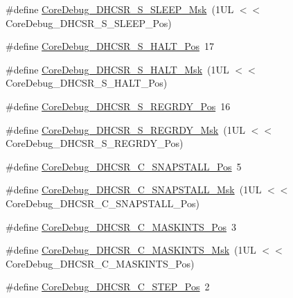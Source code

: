 \begin{DoxyCompactItemize}
\#define \hyperlink{group___c_m_s_i_s___core_debug_ga98d51538e645c2c1a422279cd85a0a25}{Core\+Debug\+\_\+\+D\+H\+C\+S\+R\+\_\+\+S\+\_\+\+S\+L\+E\+E\+P\+\_\+\+Msk}~(1\+U\+L $<$$<$ Core\+Debug\+\_\+\+D\+H\+C\+S\+R\+\_\+\+S\+\_\+\+S\+L\+E\+E\+P\+\_\+\+Pos)
\item 
\#define \hyperlink{group___c_m_s_i_s___core_debug_ga760a9a0d7f39951dc3f07d01f1f64772}{Core\+Debug\+\_\+\+D\+H\+C\+S\+R\+\_\+\+S\+\_\+\+H\+A\+L\+T\+\_\+\+Pos}~17
\item 
\#define \hyperlink{group___c_m_s_i_s___core_debug_ga9f881ade3151a73bc5b02b73fe6473ca}{Core\+Debug\+\_\+\+D\+H\+C\+S\+R\+\_\+\+S\+\_\+\+H\+A\+L\+T\+\_\+\+Msk}~(1\+U\+L $<$$<$ Core\+Debug\+\_\+\+D\+H\+C\+S\+R\+\_\+\+S\+\_\+\+H\+A\+L\+T\+\_\+\+Pos)
\item 
\#define \hyperlink{group___c_m_s_i_s___core_debug_ga20a71871ca8768019c51168c70c3f41d}{Core\+Debug\+\_\+\+D\+H\+C\+S\+R\+\_\+\+S\+\_\+\+R\+E\+G\+R\+D\+Y\+\_\+\+Pos}~16
\item 
\#define \hyperlink{group___c_m_s_i_s___core_debug_gac4cd6f3178de48f473d8903e8c847c07}{Core\+Debug\+\_\+\+D\+H\+C\+S\+R\+\_\+\+S\+\_\+\+R\+E\+G\+R\+D\+Y\+\_\+\+Msk}~(1\+U\+L $<$$<$ Core\+Debug\+\_\+\+D\+H\+C\+S\+R\+\_\+\+S\+\_\+\+R\+E\+G\+R\+D\+Y\+\_\+\+Pos)
\item 
\#define \hyperlink{group___c_m_s_i_s___core_debug_ga85747214e2656df6b05ec72e4d22bd6d}{Core\+Debug\+\_\+\+D\+H\+C\+S\+R\+\_\+\+C\+\_\+\+S\+N\+A\+P\+S\+T\+A\+L\+L\+\_\+\+Pos}~5
\item 
\#define \hyperlink{group___c_m_s_i_s___core_debug_ga53aa99b2e39a67622f3b9973e079c2b4}{Core\+Debug\+\_\+\+D\+H\+C\+S\+R\+\_\+\+C\+\_\+\+S\+N\+A\+P\+S\+T\+A\+L\+L\+\_\+\+Msk}~(1\+U\+L $<$$<$ Core\+Debug\+\_\+\+D\+H\+C\+S\+R\+\_\+\+C\+\_\+\+S\+N\+A\+P\+S\+T\+A\+L\+L\+\_\+\+Pos)
\item 
\#define \hyperlink{group___c_m_s_i_s___core_debug_ga0d2907400eb948a4ea3886ca083ec8e3}{Core\+Debug\+\_\+\+D\+H\+C\+S\+R\+\_\+\+C\+\_\+\+M\+A\+S\+K\+I\+N\+T\+S\+\_\+\+Pos}~3
\item 
\#define \hyperlink{group___c_m_s_i_s___core_debug_ga77fe1ef3c4a729c1c82fb62a94a51c31}{Core\+Debug\+\_\+\+D\+H\+C\+S\+R\+\_\+\+C\+\_\+\+M\+A\+S\+K\+I\+N\+T\+S\+\_\+\+Msk}~(1\+U\+L $<$$<$ Core\+Debug\+\_\+\+D\+H\+C\+S\+R\+\_\+\+C\+\_\+\+M\+A\+S\+K\+I\+N\+T\+S\+\_\+\+Pos)
\item 
\#define \hyperlink{group___c_m_s_i_s___core_debug_gae1fc39e80de54c0339cbb1b298a9f0f9}{Core\+Debug\+\_\+\+D\+H\+C\+S\+R\+\_\+\+C\+\_\+\+S\+T\+E\+P\+\_\+\+Pos}~2
\item 
$$
\end{DoxyCompactItemize}
